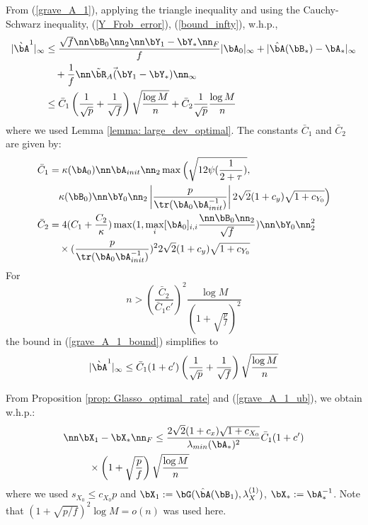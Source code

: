 \begin{IEEEproof}
From (\ref{grave_A_1}), applying the triangle inequality and using the Cauchy-Schwarz inequality, (\ref{Y_Frob_error}), (\ref{bound_infty}), w.h.p.,
\begin{align}
	|\grave{\bA}^1|_\infty %
		&\leq \frac{\sqrt{f} \nn \bB_0\nn_2 \nn \bY_1-\bY_*\nn_F}{f} |\bA_0|_\infty + |\hat{\bA}(\bB_*)-\bA_*|_\infty \nonumber \\
		&\quad + \frac{1}{f}\nn \tilde{\bR}_A\vec(\bY_1-\bY_*) \nn_\infty \nonumber \\
		&\leq \bar{C}_1 \left( \frac{1}{\sqrt{p}} + \frac{1}{\sqrt{f}} \right) \sqrt{\frac{\log M}{n}} + \bar{C}_2 \frac{1}{\sqrt{p}} \frac{\log M}{n} 	\label{grave_A_1_bound}
\end{align}
where we used Lemma \ref{lemma: large_dev_optimal}. The constants $\bar{C}_1$ and $\bar{C}_2$ are given by:
\begin{align*}
	\bar{C}_1 &= \kappa(\bA_0) \nn\bA_{init}\nn_2 \max \Big(\sqrt{12\psi(\frac{1}{2+\tau})}, \\
		&\quad \kappa(\bB_0) \nn\bY_0\nn_2 \left|\frac{p}{\tr(\bA_0\bA_{init}^{-1})}\right| 2\sqrt{2}(1+c_y)\sqrt{1+c_{Y_0}} \Big) \\
	\bar{C}_2 &= 4 (C_1+\frac{C_2}{\kappa}) \max(1,\max_i [\bA_0]_{i,i} \frac{\nn \bB_0\nn_2}{\sqrt{f}}) \nn \bY_0\nn_2^2 \\
		&\quad \times (\frac{p}{\tr(\bA_0\bA_{init}^{-1})})^2 2\sqrt{2} (1+c_y) \sqrt{1+c_{Y_0}}
\end{align*}
For 
\begin{equation} \label{condition_2}
	n> (\frac{\bar{C}_2}{\bar{C}_1 c'})^2 \frac{\log M}{(1+\sqrt{\frac{p}{f}})^2}
\end{equation}
the bound in (\ref{grave_A_1_bound}) simplifies to
\begin{equation} \label{grave_A_1_ub}
	|\grave{\bA}^1|_\infty \leq \bar{C}_1 (1+c') \left(\frac{1}{\sqrt{p}}+\frac{1}{\sqrt{f}}\right) \sqrt{\frac{\log M}{n}}
\end{equation}



From Proposition \ref{prop: Glasso_optimal_rate} and (\ref{grave_A_1_ub}), we obtain w.h.p.:
\begin{align}
	\nn &\bX_1-\bX_* \nn_F \leq \frac{2\sqrt{2}(1+c_x)\sqrt{1+c_{X_0}}}{\lambda_{min}(\bA_*)^2} \bar{C}_1 (1+c') \nonumber \\
		&\quad \times \left( 1 + \sqrt{\frac{p}{f}} \right) \sqrt{\frac{\log M}{n}} \label{X_Frob_error}
\end{align}
where we used $s_{X_0}\leq c_{X_0} p$ and $\bX_1:=\bG(\hat{\bA}(\bB_1), \lambda_X^{(1)})$, $\bX_*:=\bA_*^{-1}$. Note that $(1+\sqrt{p/f})^2\log M=o(n)$ was used here.


\end{IEEEproof}
